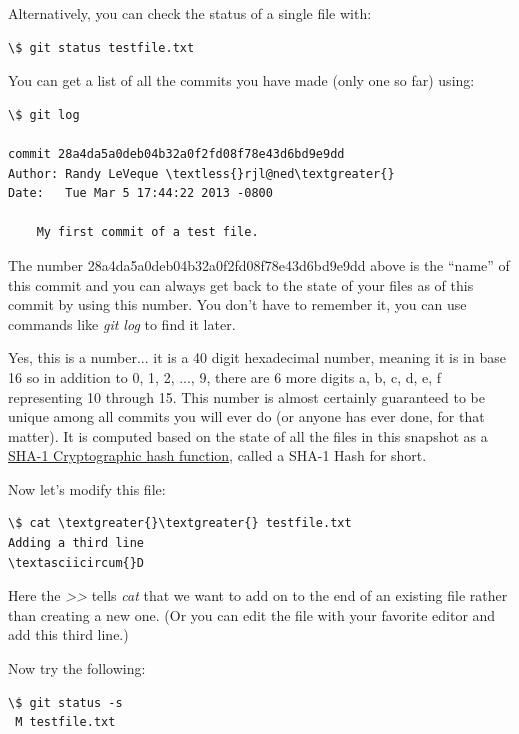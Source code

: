 \documentclass[letterpaper,10pt,english]{sphinxmanual}
\begin{document}
\begin{enumerate}
Alternatively, you can check the status of a single file with:

\begin{Verbatim}[commandchars=\\\{\}]
\$ git status testfile.txt
\end{Verbatim}

You can get a list of all the commits you have made (only one so far)
using:

\begin{Verbatim}[commandchars=\\\{\}]
\$ git log

commit 28a4da5a0deb04b32a0f2fd08f78e43d6bd9e9dd
Author: Randy LeVeque \textless{}rjl@ned\textgreater{}
Date:   Tue Mar 5 17:44:22 2013 -0800

    My first commit of a test file.
\end{Verbatim}

The number 28a4da5a0deb04b32a0f2fd08f78e43d6bd9e9dd above is the ``name''
of this commit and you can always get back to the state of your files as
of this commit by using this number.  You don't have to remember it, you
can use commands like \emph{git log} to find it later.

Yes, this is a number... it is a 40 digit hexadecimal number, meaning it
is in base 16 so in addition to 0, 1, 2, ..., 9, there are 6 more digits
a, b, c, d, e, f representing 10 through 15.  This number is almost
certainly guaranteed to be unique among all commits you will ever
do (or anyone has ever done, for that matter).  It is computed based
on the state of all the files in this snapshot as a \href{http://en.wikipedia.org/wiki/SHA-1}{SHA-1
Cryptographic hash function},
called a SHA-1 Hash for short.

Now let's modify this file:

\begin{Verbatim}[commandchars=\\\{\}]
\$ cat \textgreater{}\textgreater{} testfile.txt
Adding a third line
\textasciicircum{}D
\end{Verbatim}

Here the \emph{\textgreater{}\textgreater{}} tells \emph{cat} that we want to add on to the end of an
existing file rather than creating a new one.  (Or you can edit the file
with your favorite editor and add this third line.)

Now try the following:

\begin{Verbatim}[commandchars=\\\{\}]
\$ git status -s
 M testfile.txt
\end{Verbatim}


\end{enumerate}
\end{document}

